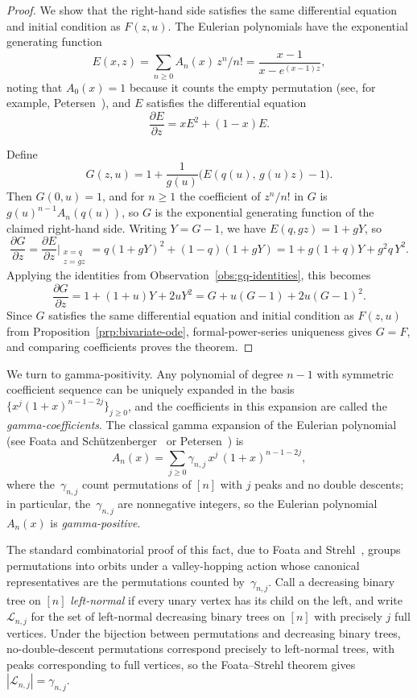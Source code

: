 \documentclass[10pt]{article}
\theoremstyle{plain}
\begin{document}
\begin{proof}
We show that the right-hand side satisfies the same differential equation and initial condition as $F(z,u)$. The Eulerian polynomials have the exponential generating function
\[
	E(x,z) = \sum_{n \geq 0} A_n(x)\, z^n/n! = \frac{x-1}{x - e^{(x-1)z}},
\]
noting that $A_0(x) = 1$ because it counts the empty permutation (see, for example, Petersen~\cite{petersen:eulerian-number:}), and $E$ satisfies the differential equation
\[
	\frac{\partial E}{\partial z} = xE^2 + (1-x)E.
\]

Define
\[
	G(z,u) = 1 + \frac{1}{g(u)}\bigl(E(q(u),\, g(u)z) - 1\bigr).
\]
Then $G(0,u) = 1$, and for $n \geq 1$ the coefficient of $z^n/n!$ in $G$ is $g(u)^{n-1} A_n(q(u))$, so $G$ is the exponential generating function of the claimed right-hand side. Writing $Y = G - 1$, we have $E(q, gz) = 1 + gY$, so
\[
	\frac{\partial G}{\partial z} = \frac{\partial E}{\partial z}\bigg|_{\substack{x=q \\ z=gz}} = q(1+gY)^2 + (1-q)(1+gY) = 1 + g(1+q)Y + g^2 q\, Y^2.
\]
Applying the identities from Observation~\ref{obs:gq-identities}, this becomes
\[
	\frac{\partial G}{\partial z} = 1 + (1+u)Y + 2uY^2 = G + u(G-1) + 2u(G-1)^2.
\]
Since $G$ satisfies the same differential equation and initial condition as $F(z,u)$ from Proposition~\ref{prp:bivariate-ode}, formal-power-series uniqueness gives $G = F$, and comparing coefficients proves the theorem.
\end{proof}

%
%

We turn to gamma-positivity. Any polynomial of degree $n-1$ with symmetric coefficient sequence can be uniquely expanded in the basis $\{x^j (1+x)^{n-1-2j}\}_{j \geq 0}$, and the coefficients in this expansion are called the \emph{gamma-coefficients}. The classical gamma expansion of the Eulerian polynomial (see Foata and Sch\"utzenberger~\cite{foata:theorie-geometr:} or Petersen~\cite{petersen:eulerian-number:}) is
\[
	A_n(x) = \sum_{j \geq 0} \gamma_{n,j}\, x^j\,(1+x)^{n-1-2j},
\]
where the~$\gamma_{n,j}$ count permutations of $[n]$ with $j$ peaks and no double descents; in particular, the~$\gamma_{n,j}$ are nonnegative integers, so the Eulerian polynomial~$A_n(x)$ is \emph{gamma-positive}.

The standard combinatorial proof of this fact, due to Foata and Strehl~\cite{foata:rearrangements-:}, groups permutations into orbits under a valley-hopping action whose canonical representatives are the permutations counted by~$\gamma_{n,j}$. Call a decreasing binary tree on $[n]$ \emph{left-normal} if every unary vertex has its child on the left, and write $\mathcal{L}_{n,j}$ for the set of left-normal decreasing binary trees on $[n]$ with precisely $j$ full vertices. Under the bijection between permutations and decreasing binary trees, no-double-descent permutations correspond precisely to left-normal trees, with peaks corresponding to full vertices, so the Foata--Strehl theorem gives $|\mathcal{L}_{n,j}| = \gamma_{n,j}$.
\end{document}
